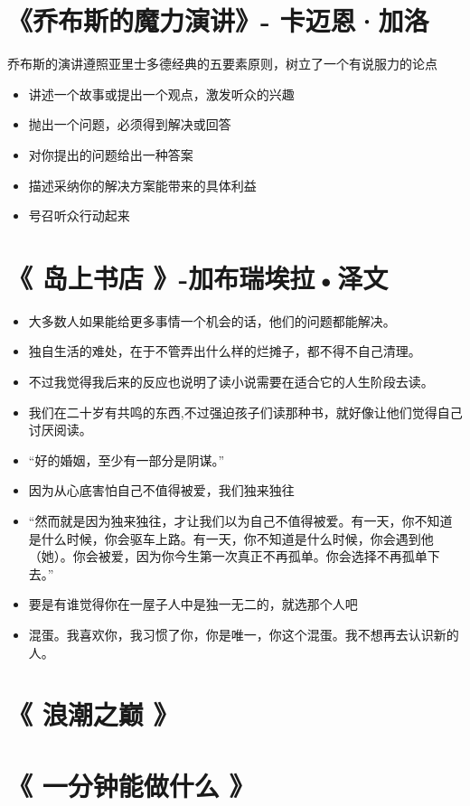 \documentclass[UTF8,a4paper,8pt]{ctexart}
\begin{document}
 \newpage
 \section{《乔布斯的魔力演讲》- 卡迈恩·加洛}
 乔布斯的演讲遵照亚里士多德经典的五要素原则，树立了一个有说服力的论点
 \begin{itemize}
 	\item 讲述一个故事或提出一个观点，激发听众的兴趣
 	\item 抛出一个问题，必须得到解决或回答
 	\item 对你提出的问题给出一种答案
 	\item 描述采纳你的解决方案能带来的具体利益
 	\item 号召听众行动起来
 \end{itemize}

\newpage
 \section{《 岛上书店 》-加布瑞埃拉•泽文  }
 \begin{itemize}
 	\item 大多数人如果能给更多事情一个机会的话，他们的问题都能解决。
 	\item 独自生活的难处，在于不管弄出什么样的烂摊子，都不得不自己清理。
 	\item 不过我觉得我后来的反应也说明了读小说需要在适合它的人生阶段去读。
 	\item 我们在二十岁有共鸣的东西,不过强迫孩子们读那种书，就好像让他们觉得自己讨厌阅读。
 	\item “好的婚姻，至少有一部分是阴谋。”
 	\item 因为从心底害怕自己不值得被爱，我们独来独往
 	\item “然而就是因为独来独往，才让我们以为自己不值得被爱。有一天，你不知道是什么时候，你会驱车上路。有一天，你不知道是什么时候，你会遇到他（她）。你会被爱，因为你今生第一次真正不再孤单。你会选择不再孤单下去。”
 	\item 要是有谁觉得你在一屋子人中是独一无二的，就选那个人吧
 	\item 混蛋。我喜欢你，我习惯了你，你是唯一，你这个混蛋。我不想再去认识新的人。
 \end{itemize}
 \newpage
 \section{《 浪潮之巅 》 }
 
 \newpage
 \section{《 一分钟能做什么 》 }    
\end{document}
